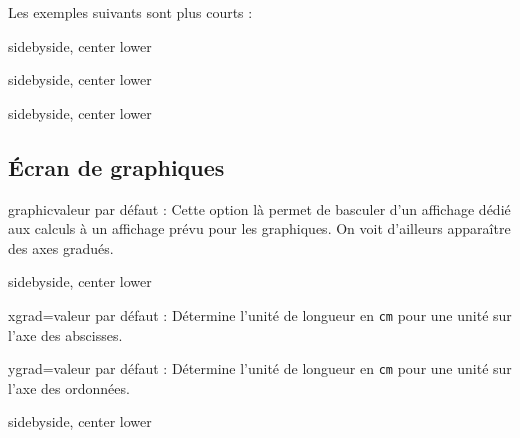 \documentclass[10pt,french,a4paper]{article}
\begin{document}
\noindent Les exemples suivants sont plus courts :\medskip

\begin{dispExample*}{sidebyside, center lower}
\end{dispExample*}

\begin{dispExample*}{sidebyside, center lower}
\end{dispExample*}

\begin{dispExample*}{sidebyside, center lower}
\end{dispExample*}

\subsection{\'Ecran de graphiques}

\begin{docKey}{graphic}{}{valeur par défaut : }
    Cette option là permet de basculer d'un affichage dédié aux calculs à un affichage prévu pour les graphiques. On voit d'ailleurs apparaître des axes gradués.
\end{docKey}%

\begin{dispExample*}{sidebyside, center lower}
\Ecran[width=6, height=4, graphic=true]{}
\end{dispExample*}

\begin{docKey}{xgrad}{=}{valeur par défaut : }
    Détermine l'unité de longueur en \texttt{cm} pour une unité sur l'axe des abscisses.
\end{docKey}

\begin{docKey}{ygrad}{=}{valeur par défaut : }
    Détermine l'unité de longueur en \texttt{cm} pour une unité sur l'axe des ordonnées.
\end{docKey}

\begin{dispExample*}{sidebyside, center lower}
\Ecran[width=6, height=4, graphic=true, xgrad=0.25, ygrad=1]{}
\end{dispExample*}
\end{document}

